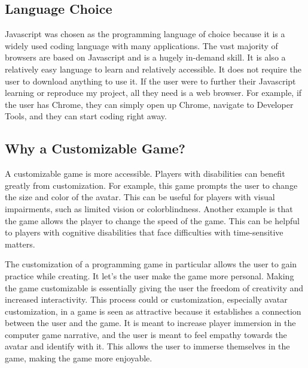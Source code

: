 \documentclass[10pt,twocolumn]{article}
\begin{document}
\subsection{Language Choice}
Javascript was chosen as the programming language of choice because it is a widely used coding language with many applications. The vast majority of browsers are based on Javascript and is a hugely in-demand skill. It is also a relatively easy language to learn and relatively accessible. It does not require the user to download anything to use it. If the user were to further their Javascript learning or reproduce my project, all they need is a web browser. For example, if the user has Chrome, they can simply open up Chrome, navigate to Developer Tools, and they can start coding right away.


\subsection{Why a Customizable Game?}
A customizable game is more accessible. Players with disabilities can benefit greatly from customization. For example, this game prompts the user to change the size and color of the avatar. This can be useful for players with visual impairments, such as limited vision or colorblindness. Another example is that the game allows the player to change the speed of the game. This can be helpful to players with cognitive disabilities that face difficulties with time-sensitive matters.

The customization of a programming game in particular allows the user to gain practice while creating. It let's the user make the game more personal. Making the game customizable is essentially giving the user the freedom of creativity and increased interactivity. This process could or customization, especially avatar customization, in a game is seen as attractive because it establishes a connection between the user and the game. It is meant to increase player immersion in the computer game narrative, and the user is meant to feel empathy towards the avatar and identify with it. \cite{qin2009measuring} This allows the user to immerse themselves in the game, making the game more enjoyable. 
\end{document}
